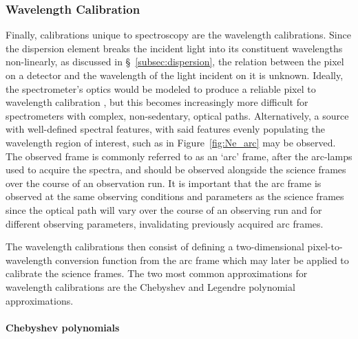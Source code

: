 \subsubsection{Wavelength Calibration}

Finally, calibrations unique to spectroscopy are the wavelength calibrations. Since the dispersion element breaks the incident light into its constituent wavelengths non-linearly, as discussed in \S~\ref{subsec:dispersion}, the relation between the pixel on a detector and the wavelength of the light incident on it is unknown. Ideally, the spectrometer's optics would be modeled to produce a reliable pixel to wavelength calibration \citep[see E.g.][]{WavCalSpectraModel}, but this becomes increasingly more difficult for spectrometers with complex, non-sedentary, optical paths. Alternatively, a source with well-defined spectral features, with said features evenly populating the wavelength region of interest, such as in Figure~\ref{fig:Ne_arc} may be observed. The observed frame is commonly referred to as an `arc' frame, after the arc-lamps used to acquire the spectra, and should be observed alongside the science frames over the course of an observation run. It is important that the arc frame is observed at the same observing conditions and parameters as the science frames since the optical path will vary over the course of an observing run and for different observing parameters, invalidating previously acquired arc frames.
\prgph

The wavelength calibrations then consist of defining a two-dimensional pixel-to-wave\-length conversion function from the arc frame which may later be applied to calibrate the science frames. The two most common approximations for wavelength calibrations are the Chebyshev and Legendre polynomial approximations.

\paragraph{Chebyshev polynomials}

